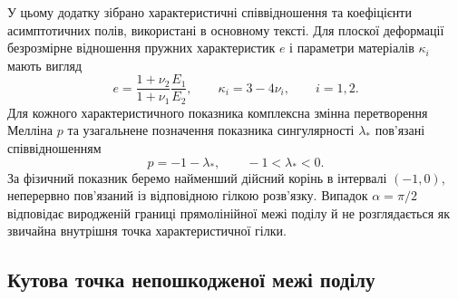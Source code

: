 У цьому додатку зібрано характеристичні співвідношення та коефіцієнти асимптотичних полів, використані в основному тексті. Для плоскої деформації безрозмірне відношення пружних характеристик $e$ і параметри матеріалів $\kappa_i$ мають вигляд
\begin{equation*}
  e=\frac{1+\nu_2}{1+\nu_1}\frac{E_1}{E_2},
  \qquad
  \kappa_i=3-4\nu_i,\qquad i=1,2.
\end{equation*}
Для кожного характеристичного показника комплексна змінна перетворення Мелліна $p$ та узагальнене позначення показника сингулярності $\lambda_*$ пов’язані співвідношенням
\begin{equation*}
  p=-1-\lambda_*,
  \qquad -1<\lambda_*<0.
\end{equation*}
За фізичний показник беремо найменший дійсний корінь в інтервалі $(-1,0)$, неперервно пов’язаний із відповідною гілкою розв’язку. Випадок $\alpha=\pi/2$ відповідає виродженій границі прямолінійної межі поділу й не розглядається як звичайна внутрішня точка характеристичної гілки.

\subsection{Кутова точка непошкодженої межі поділу}


